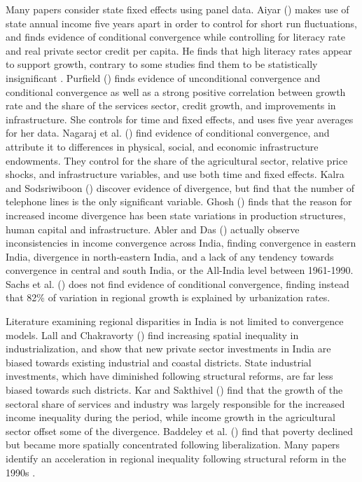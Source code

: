 \documentclass[a4paper, 11pt]{article}
\begin{document}
Many papers \citep{nagaraj_long-run_2000,aiyar_growth_2001,purfield_mind_2006,kalirajan_economic_2010,cherodian_regional_2015} consider state fixed effects using panel data.  Aiyar (\citeyear{aiyar_growth_2001}) makes use of state annual income five years apart in order to control for short run fluctuations, and finds evidence of conditional convergence while controlling for literacy rate and real private sector credit per capita.  He finds that high literacy rates appear to support growth, contrary to some studies find them to be statistically insignificant \citep{purfield_mind_2006,kalirajan_economic_2010}.  Purfield (\citeyear{purfield_mind_2006}) finds evidence of unconditional convergence and conditional convergence as well as a strong positive correlation between growth rate and the share of the services sector, credit growth, and improvements in infrastructure.  She controls for time and fixed effects, and uses five year averages for her data.  Nagaraj et al. (\citeyear{nagaraj_long-run_2000}) find evidence of conditional convergence, and attribute it to differences in physical, social, and economic infrastructure endowments.  They control for the share of the agricultural sector, relative price shocks, and infrastructure variables, and use both time and fixed effects.  Kalra and Sodsriwiboon (\citeyear{kalirajan_economic_2010}) discover evidence of divergence, but find that the number of telephone lines is the only significant variable.  Ghosh (\citeyear{ghosh_economic_2008}) finds that the reason for increased income divergence has been state variations in production structures, human capital and infrastructure.  Abler and Das (\citeyear{abler_determinants_1998}) actually observe inconsistencies in income convergence across India, finding convergence in eastern India, divergence in north-eastern India, and a lack of any tendency towards convergence in central and south India, or the All-India level between 1961-1990. Sachs et al. (\citeyear{sachs2002understanding}) does not find evidence of conditional convergence, finding instead that 82\% of variation in regional growth is explained by urbanization rates.  \par

Literature examining regional disparities in India is not limited to convergence models.  Lall and Chakravorty (\citeyear{lall_unu-wider_2015}) find increasing spatial inequality in industrialization, and show that new private sector investments in India are biased towards existing industrial and coastal districts.  State industrial investments, which have diminished following structural reforms, are far less biased towards such districts.  Kar and Sakthivel (\citeyear{kar_regional_2006}) find that the growth of the sectoral share of services and industry was largely responsible for the increased income inequality during the period, while income growth in the agricultural sector offset some of the divergence. Baddeley et al. (\citeyear{baddeley_divergence_2006}) find that poverty declined but became more spatially concentrated following liberalization.  Many papers identify an acceleration in regional inequality following structural reform in the 1990s \citep{jha_reducing_2002,chakravorty_capital_2003,kar_regional_2006}.\par
\end{document}
